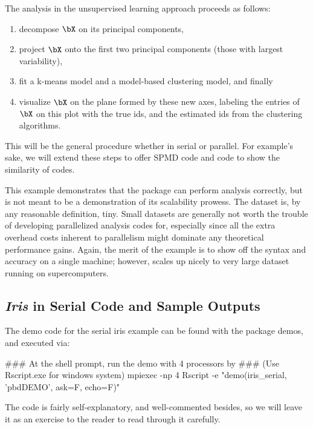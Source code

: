 The analysis in the unsupervised learning approach proceeds as follows:
\begin{enumerate}
\item decompose $\bX$ on its principal components,
\item project $\bX$ onto the first two principal components (those with largest variability),
\item fit a k-means model and a model-based clustering model, and finally
\item visualize $\bX$ on the plane formed by these new axes, labeling the entries of $\bX$ on this plot with the true ids, and the estimated ids from the clustering algorithms.
\end{enumerate}
This will be the general procedure whether in serial or parallel.  For example's sake, we will extend these steps 
to offer SPMD code and  code to show the similarity of codes.

This example demonstrates that the
 package
can perform analysis correctly, but is not
meant to be a demonstration of its scalability prowess.  The  dataset is, by any reasonable definition, tiny.  Small datasets are generally not worth the trouble of developing parallelized analysis codes for, especially since all the extra overhead costs inherent to parallelism might dominate any theoretical performance gains.  Again, the merit of the example is to show off the syntax and accuracy on a single machine; however,  scales up nicely to very large dataset running on supercomputers.



\subsection{{\it Iris} in Serial Code and Sample Outputs}

The demo code for the serial iris example can be found with the package demos, and executed via:
\begin{Command}
### At the shell prompt, run the demo with 4 processors by
### (Use Rscript.exe for windows system)
mpiexec -np 4 Rscript -e "demo(iris_serial, 'pbdDEMO', ask=F, echo=F)"
\end{Command}

The code is fairly self-explanatory, and well-commented besides, so we will leave it as an exercise to the reader to read through it carefully.

